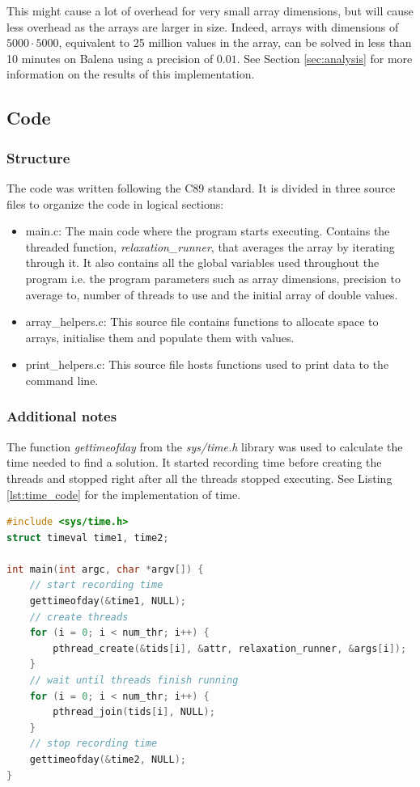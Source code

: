 \documentclass[letterpaper,12pt]{article}
\begin{document}
This might cause a lot of overhead for very small array dimensions, but will cause less overhead as the arrays are larger in size. Indeed, arrays with dimensions of $5000\cdot5000$, equivalent to 25 million values in the array, can be solved in less than 10 minutes on Balena using a precision of $0.01$. See Section \ref{sec:analysis} for more information on the results of this implementation.

\subsection{Code}

\subsubsection{Structure}

The code was written following the C89 standard. It is divided in three source files to organize the code in logical sections:

\begin{itemize}
    \item main.c: The main code where the program starts executing. Contains the threaded function, \textit{relaxation\_runner}, that averages the array by iterating through it. It also contains all the global variables used throughout the program i.e. the program parameters such as array dimensions, precision to average to, number of threads to use and the initial array of double values.
    \item array\_helpers.c: This source file contains functions to allocate space to arrays, initialise them and populate them with values.
    \item print\_helpers.c: This source file hosts functions used to print data to the command line.
\end{itemize}

\subsubsection{Additional notes}

The function \textit{gettimeofday} from the \textit{sys/time.h} library \cite{c_systime} was used to calculate the time needed to find a solution. It started recording time before creating the threads and stopped right after all the threads stopped executing. See Listing \ref{lst:time_code} for the implementation of time.

\begin{lstlisting}[language=C, caption=Recording time (main.c), label={lst:time_code}]
#include <sys/time.h>
struct timeval time1, time2;

int main(int argc, char *argv[]) {
    // start recording time
	gettimeofday(&time1, NULL);
	// create threads
	for (i = 0; i < num_thr; i++) {
		pthread_create(&tids[i], &attr, relaxation_runner, &args[i]);
	}
	// wait until threads finish running
	for (i = 0; i < num_thr; i++) {
		pthread_join(tids[i], NULL);
	}
	// stop recording time
	gettimeofday(&time2, NULL); 
}
\end{lstlisting}
\end{document}
